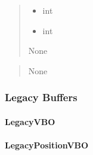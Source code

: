 \documentclass[a4paper,10pt,english,openany,oneside]{sphinxmanual}
\begin{document}
\begin{fulllineitems}
\begin{fulllineitems}
\begin{quote}
\begin{description}
\begin{itemize}
\item {} 
\sphinxAtStartPar
{} \textendash{} int

\item {} 
\sphinxAtStartPar
{} \textendash{} int

\end{itemize}

\sphinxAtStartPar
None

\end{description}\end{quote}

\end{fulllineitems}


\begin{fulllineitems}
\label{\detokenize{api/buffers:picogl.backend.modern.core.vertex.buffer.element.ModernEBO.configure}}
\pysigstartsignatures
\pysiglinewithargsret
{}
{}
{}
\pysigstopsignatures\begin{quote}\begin{description}
\sphinxAtStartPar
None

\end{description}\end{quote}

\end{fulllineitems}


\end{fulllineitems}



\subsubsection{Legacy Buffers}
\label{\detokenize{api/buffers:legacy-buffers}}

\paragraph{LegacyVBO}
\label{\detokenize{api/buffers:legacyvbo}}

\paragraph{LegacyPositionVBO}
\label{\detokenize{api/buffers:legacypositionvbo}}
\end{document}
